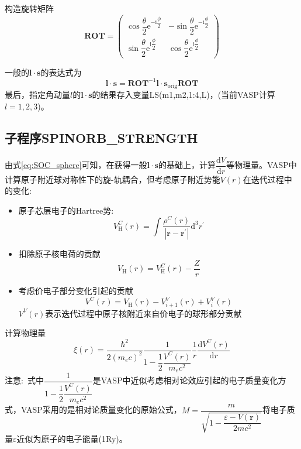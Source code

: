 \documentclass[10pt, oneside, a4paper]{article}      %
\begin{document}
构造旋转矩阵
\begin{displaymath}
	\mathbf{ROT}=
	\begin{pmatrix}
		\cos\dfrac{\theta}2\mathrm{e}^{-\mathrm{i}\dfrac{\phi}2} &-\sin\dfrac{\theta}2\mathrm{e}^{-\mathrm{i}\dfrac{\phi}2}\\
		\sin\dfrac{\theta}2\mathrm{e}^{\mathrm{i}\dfrac{\phi}2} &\cos\dfrac{\theta}2\mathrm{e}^{\mathrm{i}\dfrac{\phi}2}
	\end{pmatrix}
\end{displaymath}

一般的$\mathbf{l}\cdot\mathbf{s}$的表达式为
\begin{displaymath}
	\mathbf{l}\cdot\mathbf{s}= \mathbf{ROT}^{-1}\mathbf{l}\cdot\mathbf{s}_{\mathrm{orig}}\mathbf{ROT}
\end{displaymath}
最后，指定角动量$l$的$\mathbf{l}\cdot\mathbf{s}$的结果存入变量\textrm{LS(m1,m2,1:4,L)}，(当前\textrm{VASP}计算$l=1,2,3$)。

\subsection{子程序\bf{SPINORB\_STRENGTH}}
由式\eqref{eq:SOC_sphere}可知，在获得一般$\mathbf{l}\cdot\mathbf{s}$的基础上，计算$\dfrac{\mathrm{d}V}{\mathrm{d}r}$等物理量。\textrm{VASP}中计算原子附近球对称性下的旋-轨耦合，但考虑原子附近势能$V(r)$在迭代过程中的变化:
\begin{itemize}
	\item 原子芯层电子的\textrm{Hartree}势:
		\begin{displaymath}
			V_{\mathrm{H}}^C(r)=\int\dfrac{\rho^C(r)}{|\mathbf{r}-\mathbf{r^{\prime}}|}\mathrm{d}^3r^{\prime}
		\end{displaymath}
	\item 扣除原子核电荷的贡献
		\begin{displaymath}
			V_{\mathrm{H}}(r)=V_{\mathrm{H}}^C(r)-\dfrac{Z}r
		\end{displaymath}
	\item 考虑价电子部分变化引起的贡献
		\begin{displaymath}
			V^C(r)=V_{\mathrm{H}}(r)-V_{i+1}^{V}(r)+V_{i}^{V}(r)
		\end{displaymath}
$V^V(r)$表示迭代过程中原子核附近来自价电子的球形部分贡献
\end{itemize}
计算物理量
\begin{displaymath}
	\xi(r)=\dfrac{\hbar^2}{2(m_ec)^2}\dfrac1{1-\dfrac12\dfrac{V^C(r)}{m_ec^2}}\dfrac1r\dfrac{\mathrm{d}V^C(r)}{\mathrm{d}r}
\end{displaymath}
注意:~式中$\dfrac1{1-\dfrac12\dfrac{V^C(r)}{m_ec^2}}$是\textrm{VASP}中近似考虑相对论效应引起的电子质量变化方式，\textrm{VASP}采用的是相对论质量变化的原始公式，$M=\dfrac m{\sqrt{1-\dfrac{\varepsilon-V(\mathbf{r})}{2mc^2}}}$将电子质量$\varepsilon$近似为原子的电子能量(1\textrm{Ry})。
\end{document}
